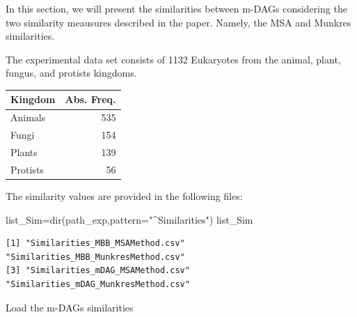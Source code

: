 \documentclass[
  letterpaper,
  DIV=11,
  numbers=noendperiod]{scrreprt}
\newenvironment{Shaded}{}{}
\newcommand{\AttributeTok}[1]{\textcolor[rgb]{0.78,0.47,0.87}{#1}}
\newcommand{\CommentTok}[1]{\textcolor[rgb]{0.36,0.39,0.44}{\textit{#1}}}
\newcommand{\DecValTok}[1]{\textcolor[rgb]{0.82,0.60,0.40}{#1}}
\newcommand{\FunctionTok}[1]{\textcolor[rgb]{0.38,0.69,0.94}{#1}}
\newcommand{\NormalTok}[1]{\textcolor[rgb]{0.67,0.70,0.75}{#1}}
\newcommand{\OtherTok}[1]{\textcolor[rgb]{0.15,0.68,0.38}{#1}}
\newcommand{\SpecialCharTok}[1]{\textcolor[rgb]{0.34,0.71,0.76}{#1}}
\newcommand{\StringTok}[1]{\textcolor[rgb]{0.60,0.76,0.47}{#1}}
\begin{document}
In this section, we will present the similarities between m-DAGs
considering the two similarity meausures described in the paper. Namely,
the MSA and Munkres similarities.

The experimental data set consists of 1132 Eukaryotes from the animal,
plant, fungus, and protists kingdoms.

\begin{longtable}[]{@{}lr@{}}
\toprule\noalign{}
Kingdom & Abs. Freq. \\
\midrule\noalign{}
\endhead
\bottomrule\noalign{}
\endlastfoot
Animals & 535 \\
Fungi & 154 \\
Plants & 139 \\
Protists & 56 \\
\end{longtable}

The similarity values are provided in the following files:

\begin{Shaded}
\begin{Highlighting}[]
\NormalTok{list\_Sim}\OtherTok{=}\FunctionTok{dir}\NormalTok{(path\_exp,}\AttributeTok{pattern=}\StringTok{"\^{}Similarities"}\NormalTok{)}
\NormalTok{list\_Sim}
\end{Highlighting}
\end{Shaded}

\begin{verbatim}
[1] "Similarities_MBB_MSAMethod.csv"      "Similarities_MBB_MunkresMethod.csv" 
[3] "Similarities_mDAG_MSAMethod.csv"     "Similarities_mDAG_MunkresMethod.csv"
\end{verbatim}

Load the m-DAGs similarities

\begin{Shaded}
\end{Shaded}
\end{document}
